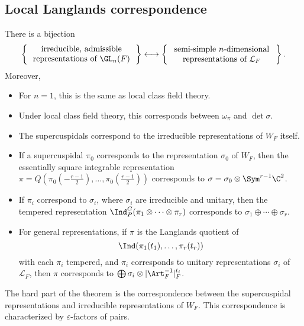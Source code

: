 \documentclass[a4paper]{article}
\begin{document}
\subsection{Local Langlands correspondence}
\begin{thm}
  There is a bijection
  \[
    \left\{\parbox{4.6cm}{\centering irreducible, admissible representations of $\GL_n(F)$}\right\} \longleftrightarrow \left\{\parbox{4.6cm}{\centering semi-simple $n$-dimensional representations of $\mathcal{L}_F$}\right\}.
  \]
  Moreover,
  \begin{itemize}
    \item For $n = 1$, this is the same as local class field theory.
    \item Under local class field theory, this corresponds between $\omega_\pi$ and $\det \sigma$.
    \item The supercuspidals correspond to the irreducible representations of $W_F$ itself.
    \item If a supercuspidal $\pi_0$ corresponds to the representation $\sigma_0$ of $W_F$, then the essentially square integrable representation $\pi = Q(\pi_0(-\frac{r-1}{2}), \ldots, \pi_0(\frac{r - 1}{2}))$ corresponds to $\sigma = \sigma_0 \otimes \Sym^{r - 1} \C^2$.

    \item If $\pi_i$ correspond to $\sigma_i$, where $\sigma_i$ are irreducible and unitary, then the tempered representation $\Ind_P^G(\pi_1 \otimes \cdots \otimes \pi_r)$ corresponds to $\sigma_1 \oplus \cdots \oplus \sigma_r$.
%
    \item For general representations, if $\pi$ is the Langlands quotient of
      \[
        \Ind(\pi_1(t_1), \ldots, \pi_r(t_r))
      \]
      with each $\pi_i$ tempered, and $\pi_i$ corresponds to unitary representations $\sigma_i$ of $\mathcal{L}_F$, then $\pi$ corresponds to $\bigoplus \sigma_i \otimes |\Art_F^{-1}|_F^{t_i}$.
  \end{itemize}
\end{thm}
The hard part of the theorem is the correspondence between the supercuspidal representations and irreducible representations of $W_F$. This correspondence is characterized by $\varepsilon$-factors of pairs.
\end{document}

